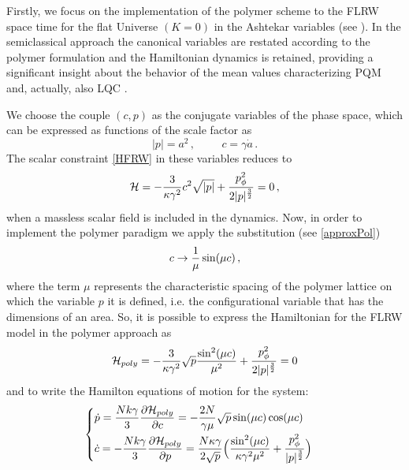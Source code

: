 \documentclass[aps,prd,twocolumn,nofootinbib,superscriptaddress]{revtex4-2}
\begin{document}
Firstly, we focus on the implementation of the polymer scheme to the FLRW space time for the flat Universe $(K=0)$ in the Ashtekar variables (see \cite{EFG}). In the semiclassical approach the canonical variables are restated according to the polymer formulation and the Hamiltonian dynamics is retained, providing a significant insight about the behavior of the mean values characterizing PQM and, actually, also LQC \cite{ASHTEKARpol}.

We choose the couple $(c,p)$ as the conjugate variables of the phase space, which can be expressed as functions of the scale factor as
\begin{equation} |p|=a^{2}\,, \hspace{1cm} c=\gamma \dot a\,.
\end{equation}
The scalar constraint \eqref{HFRW} in these variables reduces to
\begin{equation}
	\label{Hpc}
	\mathcal{H}=-{3\over\kappa\gamma^{2}}c^{2}\sqrt{|p|}+{p_{\phi}^{2}\over 2|p|^{3\over2}}=0\,,
\end{equation}
when a massless scalar field is included in the dynamics.
Now, in order to implement the polymer paradigm we apply the substitution (see \eqref{approxPol})
	\begin{equation} c\to{1\over\mu}\sin(\mu c)\,,
	\end{equation}
where the term $\mu$ represents the characteristic spacing of the polymer lattice on which the variable $p$ it is defined, i.e. the configurational variable that has the dimensions of an area. So, it is possible to express the Hamiltonian for the FLRW model in the polymer approach as
	\begin{equation}
	\label{HPOL} \mathcal{H}_{poly}=-{3\over \kappa\gamma^{2}}\sqrt{p}{\sin^2(\mu c)\over \mu^{2}}+{p_{\phi}^{2}\over 2|p|^{3\over2}}=0
		\end{equation}
and to write the Hamilton equations of motion for the system:
\begin{equation}
	\label{FRWeq}
\begin{cases}
	\begin{aligned}
	&\dot{p}={Nk\gamma\over3}{{\partial \mathcal{H}_{poly}}\over{\partial c}}=-{2N\over \gamma\mu}\sqrt{p}\sin(\mu c)\cos(\mu c)\\
	&\dot{c}=-{Nk\gamma\over3}{{\partial \mathcal{H}_{poly}}\over{\partial p}}={N\kappa\gamma\over{2\sqrt{p}}}\Big({\sin^{2}(\mu c)\over{\kappa\gamma^{2}\mu^{2}}}+{p_\phi^{2}\over{|p|^{3\over2}}}\Big)
	\end{aligned}
\end{cases}
\end{equation}
\end{document}
